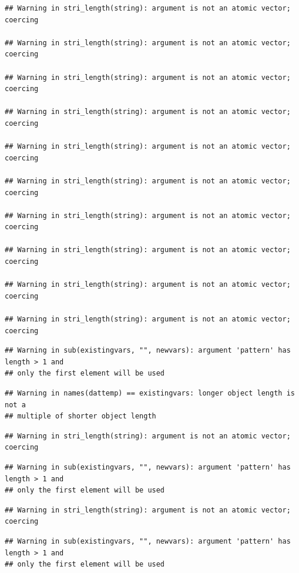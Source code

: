 \documentclass[
]{article}
\begin{document}
\begin{verbatim}
## Warning in stri_length(string): argument is not an atomic vector; coercing

## Warning in stri_length(string): argument is not an atomic vector; coercing

## Warning in stri_length(string): argument is not an atomic vector; coercing

## Warning in stri_length(string): argument is not an atomic vector; coercing

## Warning in stri_length(string): argument is not an atomic vector; coercing

## Warning in stri_length(string): argument is not an atomic vector; coercing

## Warning in stri_length(string): argument is not an atomic vector; coercing

## Warning in stri_length(string): argument is not an atomic vector; coercing

## Warning in stri_length(string): argument is not an atomic vector; coercing

## Warning in stri_length(string): argument is not an atomic vector; coercing
\end{verbatim}

\begin{verbatim}
## Warning in sub(existingvars, "", newvars): argument 'pattern' has length > 1 and
## only the first element will be used
\end{verbatim}

\begin{verbatim}
## Warning in names(dattemp) == existingvars: longer object length is not a
## multiple of shorter object length
\end{verbatim}

\begin{verbatim}
## Warning in stri_length(string): argument is not an atomic vector; coercing
\end{verbatim}

\begin{verbatim}
## Warning in sub(existingvars, "", newvars): argument 'pattern' has length > 1 and
## only the first element will be used
\end{verbatim}

\begin{verbatim}
## Warning in stri_length(string): argument is not an atomic vector; coercing
\end{verbatim}

\begin{verbatim}
## Warning in sub(existingvars, "", newvars): argument 'pattern' has length > 1 and
## only the first element will be used
\end{verbatim}
\end{document}
